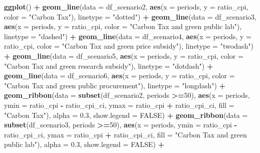 \documentclass[
]{article}
\newenvironment{Shaded}{\begin{snugshade}}{\end{snugshade}}
\newcommand{\AttributeTok}[1]{\textcolor[rgb]{0.13,0.29,0.53}{#1}}
\newcommand{\ConstantTok}[1]{\textcolor[rgb]{0.56,0.35,0.01}{#1}}
\newcommand{\DecValTok}[1]{\textcolor[rgb]{0.00,0.00,0.81}{#1}}
\newcommand{\FloatTok}[1]{\textcolor[rgb]{0.00,0.00,0.81}{#1}}
\newcommand{\FunctionTok}[1]{\textcolor[rgb]{0.13,0.29,0.53}{\textbf{#1}}}
\newcommand{\NormalTok}[1]{#1}
\newcommand{\SpecialCharTok}[1]{\textcolor[rgb]{0.81,0.36,0.00}{\textbf{#1}}}
\newcommand{\StringTok}[1]{\textcolor[rgb]{0.31,0.60,0.02}{#1}}
\begin{document}
\begin{Shaded}
\begin{Highlighting}[]
\FunctionTok{ggplot}\NormalTok{() }\SpecialCharTok{+}
  \FunctionTok{geom\_line}\NormalTok{(}\AttributeTok{data =}\NormalTok{ df\_scenario2, }\FunctionTok{aes}\NormalTok{(}\AttributeTok{x =}\NormalTok{ periods, }\AttributeTok{y =}\NormalTok{ ratio\_cpi, }\AttributeTok{color =} \StringTok{"Carbon Tax"}\NormalTok{), }\AttributeTok{linetype =} \StringTok{"dotted"}\NormalTok{) }\SpecialCharTok{+}
  \FunctionTok{geom\_line}\NormalTok{(}\AttributeTok{data =}\NormalTok{ df\_scenario3, }\FunctionTok{aes}\NormalTok{(}\AttributeTok{x =}\NormalTok{ periods, }\AttributeTok{y =}\NormalTok{ ratio\_cpi, }\AttributeTok{color =} \StringTok{"Carbon Tax and green public lab"}\NormalTok{), }\AttributeTok{linetype =} \StringTok{"dashed"}\NormalTok{) }\SpecialCharTok{+}
  \FunctionTok{geom\_line}\NormalTok{(}\AttributeTok{data =}\NormalTok{ df\_scenario4, }\FunctionTok{aes}\NormalTok{(}\AttributeTok{x =}\NormalTok{ periods, }\AttributeTok{y =}\NormalTok{ ratio\_cpi, }\AttributeTok{color =} \StringTok{"Carbon Tax and green price subsidy"}\NormalTok{), }\AttributeTok{linetype =} \StringTok{"twodash"}\NormalTok{) }\SpecialCharTok{+}
  \FunctionTok{geom\_line}\NormalTok{(}\AttributeTok{data =}\NormalTok{ df\_scenario5, }\FunctionTok{aes}\NormalTok{(}\AttributeTok{x =}\NormalTok{ periods, }\AttributeTok{y =}\NormalTok{ ratio\_cpi, }\AttributeTok{color =} \StringTok{"Carbon Tax and green research subsidy"}\NormalTok{), }\AttributeTok{linetype =} \StringTok{"dotdash"}\NormalTok{) }\SpecialCharTok{+}
  \FunctionTok{geom\_line}\NormalTok{(}\AttributeTok{data =}\NormalTok{ df\_scenario6, }\FunctionTok{aes}\NormalTok{(}\AttributeTok{x =}\NormalTok{ periods, }\AttributeTok{y =}\NormalTok{ ratio\_cpi, }\AttributeTok{color =} \StringTok{"Carbon Tax and green public procurement"}\NormalTok{), }\AttributeTok{linetype =} \StringTok{"longdash"}\NormalTok{) }\SpecialCharTok{+}
  \FunctionTok{geom\_ribbon}\NormalTok{(}\AttributeTok{data =} \FunctionTok{subset}\NormalTok{(df\_scenario2, periods }\SpecialCharTok{\textgreater{}=}\DecValTok{50}\NormalTok{), }\FunctionTok{aes}\NormalTok{(}\AttributeTok{x =}\NormalTok{ periods, }\AttributeTok{ymin =}\NormalTok{ ratio\_cpi }\SpecialCharTok{{-}}\NormalTok{ ratio\_cpi\_ci, }\AttributeTok{ymax =}\NormalTok{ ratio\_cpi }\SpecialCharTok{+}\NormalTok{ ratio\_cpi\_ci, }\AttributeTok{fill =} \StringTok{"Carbon Tax"}\NormalTok{), }\AttributeTok{alpha =} \FloatTok{0.3}\NormalTok{, }\AttributeTok{show.legend =} \ConstantTok{FALSE}\NormalTok{) }\SpecialCharTok{+}
  \FunctionTok{geom\_ribbon}\NormalTok{(}\AttributeTok{data =} \FunctionTok{subset}\NormalTok{(df\_scenario3, periods }\SpecialCharTok{\textgreater{}=}\DecValTok{50}\NormalTok{), }\FunctionTok{aes}\NormalTok{(}\AttributeTok{x =}\NormalTok{ periods, }\AttributeTok{ymin =}\NormalTok{ ratio\_cpi }\SpecialCharTok{{-}}\NormalTok{ ratio\_cpi\_ci, }\AttributeTok{ymax =}\NormalTok{ ratio\_cpi }\SpecialCharTok{+}\NormalTok{ ratio\_cpi\_ci, }\AttributeTok{fill =} \StringTok{"Carbon Tax and green public lab"}\NormalTok{), }\AttributeTok{alpha =} \FloatTok{0.3}\NormalTok{, }\AttributeTok{show.legend =} \ConstantTok{FALSE}\NormalTok{) }\SpecialCharTok{+}

\end{Highlighting}
\end{Shaded}
\end{document}
